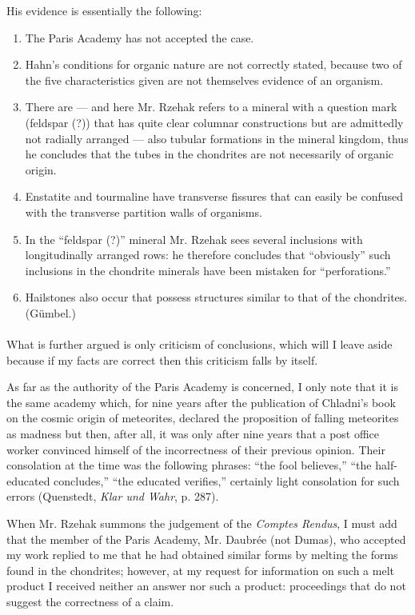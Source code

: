 \documentclass[a4paper, 12pt, oneside]{article}
\begin{document}
His evidence is essentially the following:
\begin{enumerate}
\item The Paris Academy has not accepted the case.
\item Hahn's conditions for organic nature are not correctly stated, because two of the five characteristics given are not themselves evidence of an organism.
\item There are --- and here Mr. Rzehak refers to a mineral with a question mark (feldspar (?)) that has quite clear columnar constructions but are admittedly not radially arranged --- also tubular formations in the mineral kingdom, thus he concludes that the tubes in the chondrites are not necessarily of organic origin.
\item Enstatite and tourmaline have transverse fissures that can easily be confused with the transverse partition walls of organisms.
\item In the ``feldspar (?)'' mineral Mr. Rzehak sees several inclusions with longitudinally arranged rows: he therefore concludes that ``obviously'' such inclusions in the chondrite minerals have been mistaken for ``perforations.''
\item Hailstones also occur that possess structures similar to that of the chondrites. (Gümbel.)
\end{enumerate}
\paragraph*{}
What is further argued is only criticism of conclusions, which will I leave aside because if my facts are correct then this criticism falls by itself.

As far as the authority of the Paris Academy is concerned, I only note that it is the same academy which, for nine years after the publication of Chladni's book on the cosmic origin of meteorites, declared the proposition of falling meteorites as madness but then, after all, it was only after nine years that a post office worker convinced himself of the incorrectness of their previous opinion. Their consolation at the time was the following phrases: ``the fool believes,'' ``the half-educated concludes,'' ``the educated verifies,'' certainly light consolation for such errors (Quenstedt, \emph{Klar und Wahr}, p. 287).

When Mr. Rzehak summons the judgement of the \emph{Comptes Rendus}, I must add that the member of the Paris Academy, Mr. Daubrée (not Dumas), who accepted my work replied to me that he had obtained similar forms by melting the forms found in the chondrites; however, at my request for information on such a melt product I received neither an answer nor such a product: proceedings that do not suggest the correctness of a claim.
\end{document}
